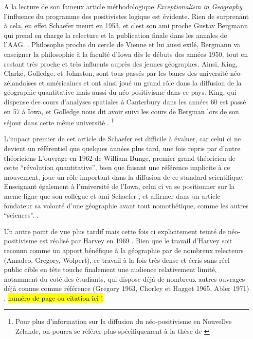 A la lecture de son fameux article méthodologique \textit{Exceptionalism in Geography} l'influence du programme des positivistes logique est évidente. Rien de surprenant à cela, en effet Schaefer meurt en 1953, et c'est son ami proche Gustav Bergmann qui prend en charge la relecture et la publication finale dans les annales de l'AAG. \autocite[32]{Gregory1978}. Philosophe proche du cercle de Vienne et lui aussi exilé, Bergmann va enseigner la philosophie à la faculté d'Iowa dès le débuts des années 1950, tout en restant très proche et très influents auprès des jeunes géographes.\autocite[192]{Buttimer1983} Ainsi, King, Clarke, Golledge, et Johnston, sont tous passés par les bancs des université néo-zélandaises et américaines et ont ainsi joué un grand rôle dans la diffusion de la géographie quantitative mais aussi du néo-positivisme dans ce pays. King, qui dispense des cours d'analyses spatiales à Canterbury dans les années 60 est passé en 57 à Iowa, et Golledge nous dit avoir suivi les cours de Bergman lors de son séjour dans cette même université \autocite[95-96]{Bailly2000}. \footnote{Pour plus d'information sur la diffusion du néo-positivisme en Nouvellve Zélande, on pourra se référer plus spécifiquement à la thèse de \textcite{Hammond1992}}

L'impact premier de cet article de Schaefer est difficile à évaluer, car celui ci ne devient un référentiel que quelques années plus tard, une fois repris par d'autre théoriciens \autocite[32]{Gregory1978} L'ouvrage en 1962 de William Bunge, premier grand théoricien de cette \enquote{révolution quantitative}, bien que faisant une référence implicite à ce mouvement, joue un rôle important dans la diffusion de ce standard scientifique. Enseignant également à l'université de l'Iowa, celui ci va se positionner sur la meme ligne que son collègue et ami Schaefer \autocite{Goodchild2001}, et affirmer dans un article fondateur \autocite{Bunge1962} sa volonté d'une géographie avant tout nomothétique, comme les autres \enquote{sciences}. \autocite{Bunge1979} \autocite{Claval2003} \autocite[429-430]{Gregory2009}. 

Un autre point de vue plus tardif mais cette fois ci explicitement teinté de néo-positivisme est réalisé par Harvey en 1969 \autocite{Harvey1969}. Bien que le travail d'Harvey soit reconnu comme un apport bénéfique à la géographie par de nombreux relecteurs (Amadeo, Gregory, Wolpert), ce travail à la fois très dense et écris sans réel public cible en tête touche finalement une audience relativement limité, notamment du coté des étudiants, qui dispose déjà de nombreux autres ouvrages déjà connus comme référence (Gregory 1963, Chorley et Hagget 1965, Abler 1971) \autocite{Johnston2008}. \hl{numéro de page ou citation ici !}

